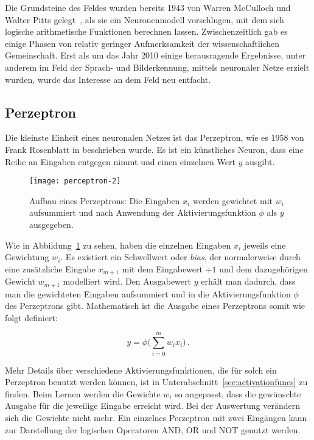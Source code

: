 Die Grundsteine des Feldes wurden bereits 1943 von Warren McCulloch und Walter Pitts gelegt~\cite{mcculloch1943logical}, 
als sie ein Neuronenmodell vorschlugen, mit dem sich logische arithmetische Funktionen berechnen lassen. 
Zwischenzeitlich gab es einige Phasen von relativ geringer Aufmerksamkeit der wissenschaftlichen Gemeinschaft. 
Erst als um das Jahr 2010 einige herausragende Ergebnisse, unter anderem im Feld der Sprach- und Bilderkennung, 
mittels neuronaler Netze erzielt wurden, wurde das Interesse an dem Feld neu entfacht. 



\subsection{Perzeptron}
Die kleinste Einheit eines neuronalen Netzes ist das Perzeptron, wie es 1958 von Frank Rosenblatt in \cite{rosenblatt1958perceptron} beschrieben wurde.
Es ist ein künstliches Neuron, dass eine Reihe an Eingaben entgegen nimmt und einen einzelnen Wert \(y\) ausgibt.

\begin{figure}[h]
    \centering
	\texttt{[image: perceptron-2]}
	\caption[Schematischer Aufbau eines Perzeptrons]{Aufbau eines Perzeptrons: Die Eingaben $x_i$ werden gewichtet mit $w_i$ aufsummiert und nach Anwendung der Aktivierungsfunktion $\phi$ als $y$ ausgegeben.}
	\label{fig:singleNeuron}
\end{figure}

Wie in Abbildung~\ref{fig:singleNeuron} zu sehen, haben die einzelnen Eingaben \(x_i\) jeweils eine Gewichtung \(w_i\).
Es existiert ein Schwellwert oder \textit{bias}, der normalerweise 
durch eine zusätzliche Eingabe \(x_{m+1}\) mit dem Eingabewert \(+1\) und dem dazugehörigen Gewicht \(w_{m+1}\) modelliert wird.
Den Ausgabewert \(y\) erhält man dadurch, dass man die gewichteten Eingaben aufsummiert und in die Aktivierungsfunktion \( \phi \) des Perzeptrons gibt.
Mathematisch ist die Ausgabe eines Perzeptrons somit wie folgt definiert:

\begin{equation}
	y = \phi \Big( \sum_{i= 0}^{m} w_i x_i \Big) \, .
\end{equation}

Mehr Details über verschiedene Aktivierungsfunktionen, die für solch ein Perzeptron benutzt werden können, ist in Unterabschnitt~\ref{sec:activationfuncs} zu finden.
Beim Lernen werden die Gewichte \(w_i\) so angepasst, dass die gewünschte Ausgabe für die jeweilige Eingabe erreicht wird.
Bei der Auswertung verändern sich die Gewichte nicht mehr.
Ein einzelnes Perzeptron mit zwei Eingängen kann zur Darstellung der logischen Operatoren AND, OR und NOT genutzt werden.

